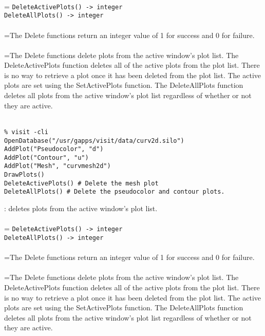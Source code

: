 \documentclass[10pt,a4paper]{report}
\begin{document}
 \\ 
\hangindent=\parindent 
\verb!DeleteActivePlots() -> integer!\\ 
\verb!DeleteAllPlots() -> integer!\\ [-3mm]

 \\ 
\hangindent=\parindent The Delete functions return an integer value of 1 for success and 0 for failure. \\[-3mm] 

 \\ 
\hangindent=\parindent The Delete functions delete plots from the active window's plot list. The DeleteActivePlots function deletes all of the active plots from the plot list. There is no way to retrieve a plot once it has been deleted from the plot list. The active plots are set using the SetActivePlots function. The DeleteAllPlots function deletes all plots from the active window's plot list regardless of whether or not they are active. \\[-3mm] 

\\[-6mm]
\begin{verbatim}% visit -cli
OpenDatabase("/usr/gapps/visit/data/curv2d.silo")
AddPlot("Pseudocolor", "d")
AddPlot("Contour", "u")
AddPlot("Mesh", "curvmesh2d")
DrawPlots()
DeleteActivePlots() # Delete the mesh plot
DeleteAllPlots() # Delete the pseudocolor and contour plots.
\end{verbatim}
\newpage


{}
: deletes plots from the active window's plot list.\\[-3mm]

 \\ 
\hangindent=\parindent 
\verb!DeleteActivePlots() -> integer!\\ 
\verb!DeleteAllPlots() -> integer!\\ [-3mm]

 \\ 
\hangindent=\parindent The Delete functions return an integer value of 1 for success and 0 for failure. \\[-3mm] 

 \\ 
\hangindent=\parindent The Delete functions delete plots from the active window's plot list. The DeleteActivePlots function deletes all of the active plots from the plot list. There is no way to retrieve a plot once it has been deleted from the plot list. The active plots are set using the SetActivePlots function. The DeleteAllPlots function deletes all plots from the active window's plot list regardless of whether or not they are active. \\[-3mm] 
\end{document}
